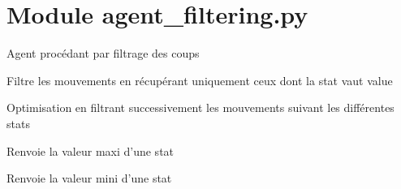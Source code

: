 \documentclass[letterpaper,10pt,french]{sphinxmanual}
\begin{document}
\section{Module agent\_filtering.py}
\label{\detokenize{index:module-agent_filtering}}\label{\detokenize{index:module-agent-filtering-py}}

\begin{fulllineitems}
\label{\detokenize{index:agent_filtering.AgentFiltering}}
Agent procédant par filtrage des coups

\begin{fulllineitems}
\label{\detokenize{index:agent_filtering.AgentFiltering.filterMoves}}
Filtre les mouvements en récupérant uniquement ceux
dont la stat vaut value

\end{fulllineitems}


\begin{fulllineitems}
\label{\detokenize{index:agent_filtering.AgentFiltering.getMove}}
Optimisation en filtrant successivement les mouvements 
suivant les différentes stats

\end{fulllineitems}


\begin{fulllineitems}
\label{\detokenize{index:agent_filtering.AgentFiltering.maxStat}}
Renvoie la valeur maxi d’une stat

\end{fulllineitems}


\begin{fulllineitems}
\label{\detokenize{index:agent_filtering.AgentFiltering.minStat}}
Renvoie la valeur mini d’une stat

\end{fulllineitems}


\end{fulllineitems}
\end{document}
